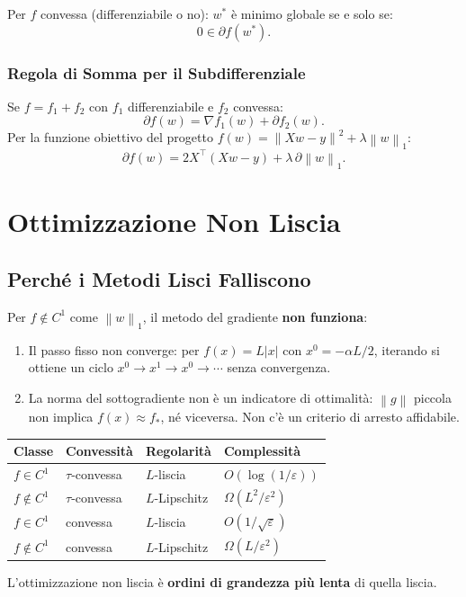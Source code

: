 \documentclass[11pt,a4paper]{article}
\theoremstyle{definition}
\theoremstyle{plain}
\theoremstyle{remark}
\newcommand{\norm}[1]{\left\| #1 \right\|}
\newcommand{\T}{^{\top}}
\newcommand{\grad}{\nabla}
\newcommand{\subgr}{\partial}
\begin{document}
\begin{keybox}
  Per $f$ convessa (differenziabile o no): $w^*$ è minimo globale se e solo se:
  \[
    0 \in \subgr f(w^*).
  \]
\end{keybox}

\subsubsection*{Regola di Somma per il Subdifferenziale}

Se $f = f_1 + f_2$ con $f_1$ differenziabile e $f_2$ convessa:
\[
  \subgr f(w) = \grad f_1(w) + \subgr f_2(w).
\]
Per la funzione obiettivo del progetto $f(w) = \norm{Xw-y}^2 + \lambda\norm{w}_1$:
\[
  \subgr f(w) = 2X\T(Xw - y) + \lambda\, \subgr\norm{w}_1.
\]

\section{Ottimizzazione Non Liscia}
\label{sec:nonsmooth}

\subsection{Perché i Metodi Lisci Falliscono}

Per $f \notin C^1$ come $\norm{w}_1$, il metodo del gradiente \textbf{non funziona}:
\begin{enumerate}
  \item Il passo fisso non converge: per $f(x) = L|x|$ con $x^0 = -\alpha L/2$,
    iterando si ottiene un ciclo $x^0 \to x^1 \to x^0 \to \cdots$ senza convergenza.
  \item La norma del sottogradiente non è un indicatore di ottimalità:
    $\norm{g}$ piccola non implica $f(x) \approx f_*$, né viceversa.
    Non c'è un criterio di arresto affidabile.
\end{enumerate}

\begin{keybox}
  \begin{center}
    \begin{tabular}{llll}
      \toprule
      Classe & Convessità & Regolarità & Complessità \\
      \midrule
      $f \in C^1$ & $\tau$-convessa & $L$-liscia & $O(\log(1/\varepsilon))$ \\
      $f \notin C^1$ & $\tau$-convessa & $L$-Lipschitz & $\Omega(L^2/\varepsilon^2)$ \\
      $f \in C^1$ & convessa & $L$-liscia & $O(1/\sqrt{\varepsilon})$ \\
      $f \notin C^1$ & convessa & $L$-Lipschitz & $\Omega(L/\varepsilon^2)$ \\
      \bottomrule
    \end{tabular}
  \end{center}
  \vspace{0.3em}
  L'ottimizzazione non liscia è \textbf{ordini di grandezza più lenta} di quella liscia.
\end{keybox}
\end{document}
